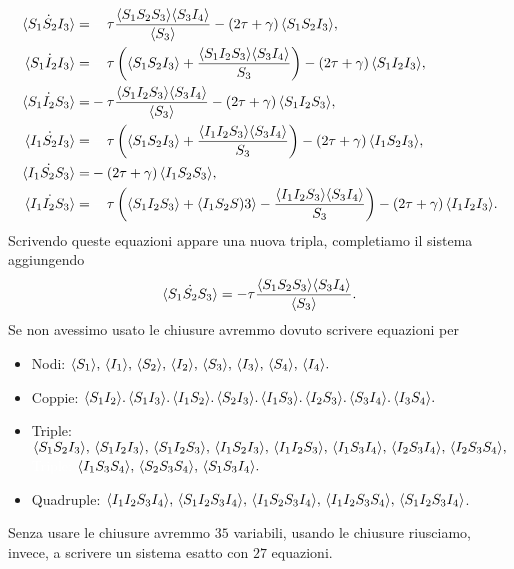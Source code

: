  \begin{equation*}
 \begin{aligned}
 		\dot{\angol{S_1S_2I_3}} =&\spa \tau \frac{\angol{S_1S_2S_3}\angol{S_3I_4}}{\angol{S_3}} -\tonde{ 2\tau + \gamma} \angol{S_1S_2I_3},\\
 		\dot{\angol{S_1I_2I_3}} =&\spa \tau \tonde{ \angol{S_1S_2I_3}+\frac{\angol{S_1I_2S_3}\angol{S_3I_4}}{S_3}} -\tonde{ 2\tau + \gamma} \angol{S_1I_2I_3},\\
 		\dot{\angol{S_1I_2S_3}} =&-\tau \frac{\angol{S_1I_2S_3}\angol{S_3I_4}}{\angol{S_3} }-\tonde{ 2\tau + \gamma} \angol{S_1I_2S_3},\\
 		\dot{\angol{I_1S_2I_3}} =&\spa \tau \tonde{ \angol{S_1S_2I_3}+\frac{\angol{I_1I_2S_3}\angol{S_3I_4}}{S_3}} -\tonde{ 2\tau + \gamma} \angol{I_1S_2I_3},\\
 		\dot{\angol{I_1S_2S_3}}=&-\tonde{ 2 \tau + \gamma} \angol{I_1S_2S_3},\\
 		\dot{\angol{I_1I_2S_3}} =&\spa\tau \tonde{ \angol{S_1I_2S_3}+ \angol{I_1S_2S)3} - \frac{\angol{I_1I_2S_3}\angol{S_3I_4}}{S_3}} -\tonde{ 2\tau + \gamma} \angol{I_1I_2I_3}.
 	\end{aligned}
 \end{equation*}
Scrivendo queste equazioni appare una nuova tripla, completiamo il sistema aggiungendo 
$$ \dot{\langle S_1S_2S_3 \rangle} =-\tau \frac{ \langle S_1S_2S_3 \rangle\langle S_3I_4 \rangle}{\langle S_3 \rangle}.$$
Se non avessimo usato le chiusure avremmo dovuto scrivere equazioni per 
\begin{itemize}
	\item Nodi: $\langle S_1 \rangle,\, \langle I_1 \rangle, \, \langle S_2 \rangle,\, \langle I_2 \rangle, \,\langle S_3 \rangle,\, \langle I_3 \rangle, \,\langle S_4 \rangle,\, \langle I_4 \rangle.$
	\item Coppie: 
$  \langle S_1I_2 \rangle. \,
	\langle S_1I_3 \rangle. \,
	\langle I_1S_2 \rangle. \,
	\langle S_2I_3 \rangle. \,
	\langle I_1S_3 \rangle. \,
	\langle I_2S_3 \rangle. \,
	\langle S_3I_4 \rangle. \,
	\langle I_3S_4 \rangle.$
	\item Triple: $ \langle S_1S_2I_3 \rangle, \,\langle  S_1I_2I_3 \rangle, \, \langle S_1I_2S_3 \rangle, \, \langle I_1S_2I_3 \rangle, \, \langle I_1I_2S_3 \rangle, \, \langle I_1S_3I_4 \rangle, \, \langle I_2S_3I_4 \rangle, \, \langle I_2S_3S_4 \rangle,$\\
	\textcolor{white}{Triple:} $\langle I_1S_3S_4 \rangle, \, \langle S_2S_3S_4 \rangle, \, \langle S_1S_3I_4 \rangle.$
	 \item Quadruple: $\langle I_1I_2S_3I_4 \rangle,\,
\langle S_1I_2S_3I_4 \rangle,\,
\langle I_1S_2S_3I_4 \rangle,\,
\langle I_1I_2S_3S_4 \rangle,\,
\langle S_1I_2S_3I_4 \rangle$.
\end{itemize}
Senza usare le chiusure avremmo  $35$ variabili, usando le chiusure riusciamo, invece, a scrivere un sistema esatto con $27$ equazioni.



 